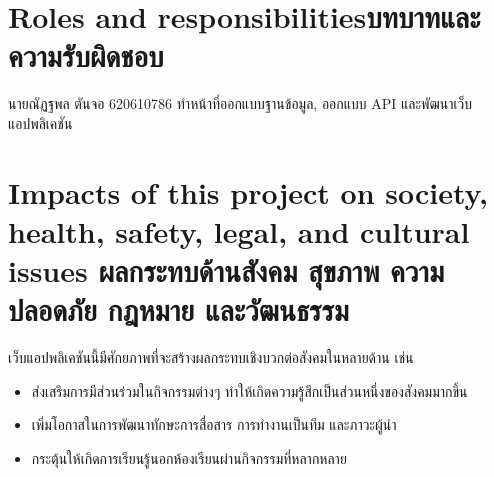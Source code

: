 \section{\ifenglish Roles and responsibilities\else บทบาทและความรับผิดชอบ\fi}
นายณัฏฐพล ตันจอ 620610786 ทำหน้าที่ออกแบบฐานข้อมูล, ออกแบบ API และพัฒนาเว็บแอปพลิเคชัน
\section{\ifenglish%
Impacts of this project on society, health, safety, legal, and cultural issues
\else%
ผลกระทบด้านสังคม สุขภาพ ความปลอดภัย กฎหมาย และวัฒนธรรม
\fi}

เว็บแอปพลิเคชันนี้มีศักยภาพที่จะสร้างผลกระทบเชิงบวกต่อสังคมในหลายด้าน เช่น 
\begin{itemize}
    \item ส่งเสริมการมีส่วนร่วมในกิจกรรมต่างๆ ทำให้เกิดความรู้สึกเป็นส่วนหนึ่งของสังคมมากขึ้น
    \item เพิ่มโอกาสในการพัฒนาทักษะการสื่อสาร การทำงานเป็นทีม และภาวะผู้นำ
    \item กระตุ้นให้เกิดการเรียนรู้นอกห้องเรียนผ่านกิจกรรมที่หลากหลาย
\end{itemize}
